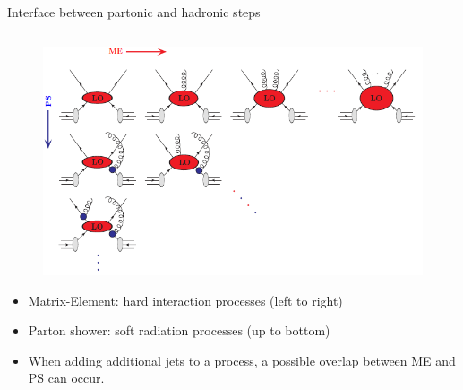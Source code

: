 \begin{frame}{Interface between partonic and hadronic steps}
\begin{columns}
\begin{column}{.50\textwidth}
\begin{figure}[!Hhtbp]
  \begin{center}
    \includegraphics[width=1.1\textwidth]{../figs/PSMEInterface.png}
  \end{center}
\end{figure}
  \vspace{-.4cm}
  \begin{block}{}\scriptsize
    \begin{itemize}
    \item Matrix-Element: hard interaction processes (left to right)
    \item Parton shower: soft radiation processes (up to bottom)
    \item When adding additional jets to a process, a possible overlap between ME and PS can occur.
    \end{itemize}
  \end{block}
\end{column}

\end{columns}
\end{frame}

